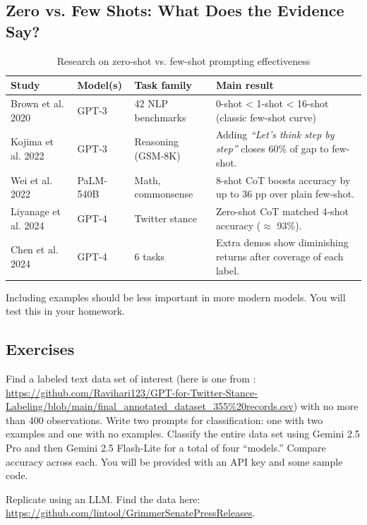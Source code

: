 \subsection{Zero vs. Few Shots: What Does the Evidence Say?}

\begin{table}[H]
\centering
\begin{tabular}{llll}
\toprule
\textbf{Study} & \textbf{Model(s)} & \textbf{Task family} & \textbf{Main result} \\
\midrule
Brown et al. 2020 & GPT-3 & 42 NLP benchmarks & 0-shot < 1-shot < 16-shot (classic few-shot curve) \\
Kojima et al. 2022 & GPT-3 & Reasoning (GSM-8K) & Adding \textit{``Let's think step by step''} closes 60\% of gap to few-shot. \\
Wei et al. 2022 & PaLM-540B & Math, commonsense & 8-shot CoT boosts accuracy by up to 36 pp over plain few-shot. \\
Liyanage et al. 2024 & GPT-4 & Twitter stance & Zero-shot CoT matched 4-shot accuracy ($\approx$ 93\%). \\
Chen et al. 2024 & GPT-4 & 6 tasks & Extra demos show diminishing returns after coverage of each label. \\
\bottomrule
\end{tabular}
\caption{Research on zero-shot vs. few-shot prompting effectiveness}
\label{tab:few-shot-research}
\end{table}

Including examples should be less important in more modern models. You will test this in your homework.

\subsection{Exercises}

\begin{exercisebox}[title={LLM Classification Comparison}]
Find a labeled text data set of interest (here is one from \cite{liyanage2024gpt}: \url{https://github.com/Ravihari123/GPT-for-Twitter-Stance-Labeling/blob/main/final_annotated_dataset_355\%20records.csv}) with no more than 400 observations. Write two prompts for classification: one with two examples and one with no examples. Classify the entire data set using Gemini 2.5 Pro and then Gemini 2.5 Flash-Lite for a total of four ``models.'' Compare accuracy across each. You will be provided with an API key and some sample code.
\end{exercisebox}

\begin{exercisebox}[title={Grimmer Replication}]
Replicate \cite{grimmer2010bayesian} using an LLM. Find the data here: \url{https://github.com/lintool/GrimmerSenatePressReleases}.
\end{exercisebox}
